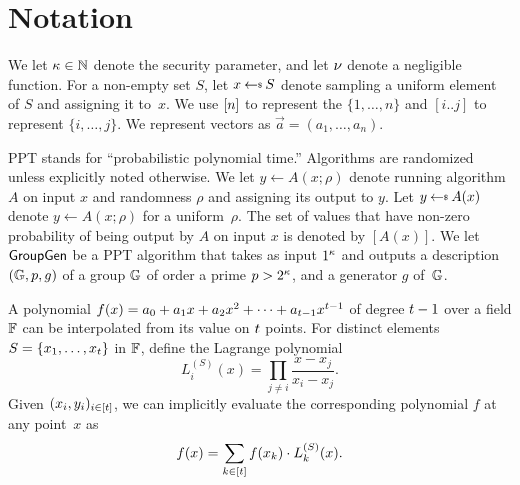 \section{Notation}

We let $\kappa \in \mathbb{N}$ denote the security parameter, and let
$\nu$ denote a negligible function.
For a non-empty set $S$, let $x\randpick S$ denote sampling
a uniform element of $S$ and assigning it to~$x$.
We use $[n]$ to represent the $\{1,\ldots,n \}$ and $[i..j]$ to represent $\{i,\ldots,j \}$.
We represent vectors as $\vec{a} = ( a_1, \ldots, a_n )$.

PPT stands for ``probabilistic polynomial time.''  Algorithms are randomized unless explicitly noted otherwise.
We let $y \gets A(x;\rho)$ denote running algorithm $A$ on
input $x$ and randomness $\rho$ and assigning its output to $y$.
Let $y \randpick A(x)$
denote $y \gets A(x;\rho)$ for a uniform~$\rho$.
The set of values that have non-zero probability of being output by $A$ on input $x$ is denoted by $[A(x)]$.
We let $\mathsf{GroupGen}$ be a PPT algorithm that takes as input $1^{\kappa}$ and outputs a description $(\mathbb{G}, p, g)$ of a group $\mathbb{G}$ of order a prime $p>2^\kappa$, and a generator $g$ of~$\mathbb{G}$.

\medskip{}
A polynomial $f(x) = a_0 + a_1 x + a_2 x^2 + \cdots + a_{t-1} x^{t-1}$
of degree $t-1$ over a field $\mathbb{F}$ can be interpolated from its value on $t$ points.
For  distinct elements~$S = \{x_1, \ldots, x_{t}\}$ in $\mathbb{F}$,
define the Lagrange polynomial
\begin{equation}\label{eqn:lagrange}
L_i^{(S)}(x) = \prod_{j \neq i } \frac{x-x_j}{x_i - x_j}.
\end{equation}
Given $(x_i, y_i)_{i \in [t]}$, we can implicitly evaluate the corresponding polynomial $f$ at any point~$x$ as
\[ f(x) = \sum_{k \in [t]} f(x_k) \cdot L^{(S)}_k(x). \]

